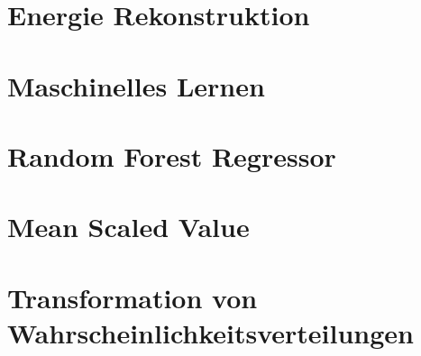\section{Energie Rekonstruktion}

\section{Maschinelles Lernen}

\section{Random Forest Regressor}

\section{Mean Scaled Value}


\section{Transformation von Wahrscheinlichkeitsverteilungen}
